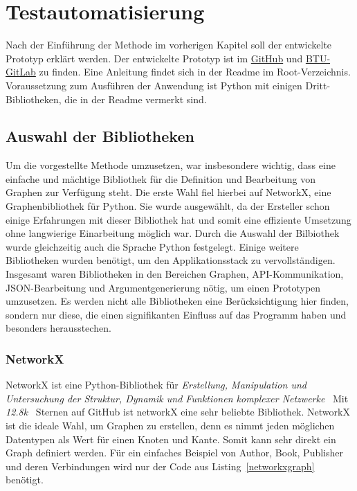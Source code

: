 \chapter{Testautomatisierung}
\label{testautomatisierung}

Nach der Einführung der Methode im vorherigen Kapitel soll der entwickelte Prototyp erklärt werden.
Der entwickelte Prototyp ist im \href{https://github.com/gernhard1337/graphql-primepath-tester}{GitHub} und \href{https://git.informatik.tu-cottbus.de/sst/abschlussarbeiten/master/lorenz_tom/graphql-tester-prototyp}{BTU-GitLab} zu finden.
Eine Anleitung findet sich in der Readme im Root-Verzeichnis.
Voraussetzung zum Ausführen der Anwendung ist Python mit einigen Dritt-Bibliotheken, die in der Readme vermerkt sind.

\section{Auswahl der Bibliotheken}

Um die vorgestellte Methode umzusetzen, war insbesondere wichtig, dass eine einfache und mächtige Bibliothek für die Definition und Bearbeitung von Graphen zur Verfügung steht.
Die erste Wahl fiel hierbei auf NetworkX, eine Graphenbibliothek für Python.
Sie wurde ausgewählt, da der Ersteller schon einige Erfahrungen mit dieser Bibliothek hat und somit eine effiziente Umsetzung ohne langwierige Einarbeitung möglich war.
Durch die Auswahl der Bilbiothek wurde gleichzeitig auch die Sprache Python festgelegt.
Einige weitere Bibliotheken wurden benötigt, um den Applikationsstack zu vervollständigen.
Insgesamt waren Bibliotheken in den Bereichen Graphen, API-Kommunikation, JSON-Bearbeitung und Argumentgenerierung nötig, um einen Prototypen umzusetzen.
Es werden nicht alle Bibliotheken eine Berücksichtigung hier finden, sondern nur diese, die einen signifikanten Einfluss auf das Programm haben und besonders herausstechen.

\subsection{NetworkX}

NetworkX ist eine Python-Bibliothek für \textit{Erstellung, Manipulation und Untersuchung der Struktur, Dynamik und Funktionen komplexer Netzwerke}~\cite[vgl. Startseite]{networkx}
Mit \textit{12.8k}~\cite{networkxgithub} Sternen auf GitHub ist networkX eine sehr beliebte Bibliothek.
NetworkX ist die ideale Wahl, um Graphen zu erstellen, denn es nimmt jeden möglichen Datentypen als Wert für einen Knoten und Kante.
Somit kann sehr direkt ein Graph definiert werden.
Für ein einfaches Beispiel von Author, Book, Publisher und deren Verbindungen wird nur der Code aus Listing~\ref{networkxgraph} benötigt.

